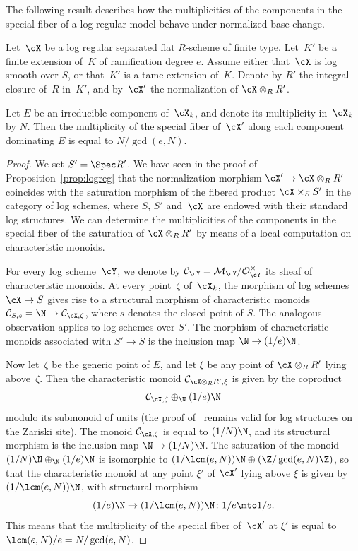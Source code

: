 The following result describes how the multiplicities of the components in the special fiber of a log regular model behave under normalized base change.
\begin{prop}\label{prop:saturated}
Let~$\cX$ be a log regular separated flat $R$\nobreakdash-scheme of finite type.
Let~$K'$ be a finite extension of~$K$ of ramification degree $e$. Assume either that~$\cX$ is log smooth over $S$, or that~$K'$ is a tame extension of~$K$.
Denote by $R'$ the integral closure of~$R$ in~$K'$, and by~$\cX'$ the normalization of $\cX\otimes_R R'$.

Let $E$ be an irreducible component of~$\cX_k$, and denote its multiplicity in~$\cX_k$ by $N$.
Then the multiplicity of the special fiber of~$\cX'$ along each component dominating $E$ is equal to $N/\gcd(e,N)$.
\end{prop}
\begin{proof}
We set $S'=\Spec R'$.
We have seen in the proof of Proposition~\ref{prop:logreg} that the normalization morphism $\cX'\to \cX\otimes_R R'$ coincides with the saturation morphism of
the fibered product $\cX\times_S S'$ in the category of log schemes, where $S$, $S'$ and~$\cX$ are endowed with their standard log structures. We can determine the multiplicities of the components in the special fiber of the saturation of $\cX\otimes_R R'$ by means of a local computation on characteristic monoids.

For every log scheme~$\cY$, we denote by $\mathcal{C}_{\cY}=\mathcal{M}_{\cY}/\mathcal{O}^{\times}_{\cY}$ its sheaf of characteristic monoids. At every point~$\zeta$ of~$\cX_k$, the morphism of log schemes
$\cX\to S$ gives rise to a structural morphism of characteristic monoids $\mathcal{C}_{S,s}=\N\to \mathcal{C}_{\cX,\zeta}$, where $s$ denotes the closed point of $S$. The analogous observation applies to log schemes over $S'$. The morphism of characteristic monoids associated with $S'\to S$ is the inclusion map $\N\to (1/e)\N$.

Now let~$\zeta$ be the generic point of $E$, and let $\xi$ be any point of $\cX\otimes_R R'$ lying above~$\zeta$.
Then the characteristic monoid
$\mathcal{C}_{\cX\otimes_R R',\xi}$ is given by the coproduct
\[
\mathcal{C}_{\cX,\zeta}\oplus_{\N}(1/e)\N
\]
modulo its submonoid of units (the proof of~\cite[2.1.1]{nakayama} remains valid for log structures on the Zariski site).
The monoid $\mathcal{C}_{\cX,\zeta}$ is equal to $(1/N)\N$, and its structural morphism is the inclusion map $\N\to (1/N)\N$. The saturation of the monoid $(1/N)\N\oplus_{\N}(1/e)\N$ is isomorphic to $(1/\lcm(e,N))\N\oplus (\Z/\gcd(e,N)\Z)$, so that the characteristic monoid at any point $\xi'$ of
$\cX'$ lying above $\xi$ is given by $(1/\lcm(e,N))\N$, with structural morphism
\[
(1/e)\N\to (1/\lcm(e,N))\N\colon 1/e\mto 1/e.
\]
This means that the multiplicity of the special fiber of~$\cX'$ at $\xi'$ is equal to $\lcm(e,N)/e=N/\gcd(e,N)$.
\end{proof}
